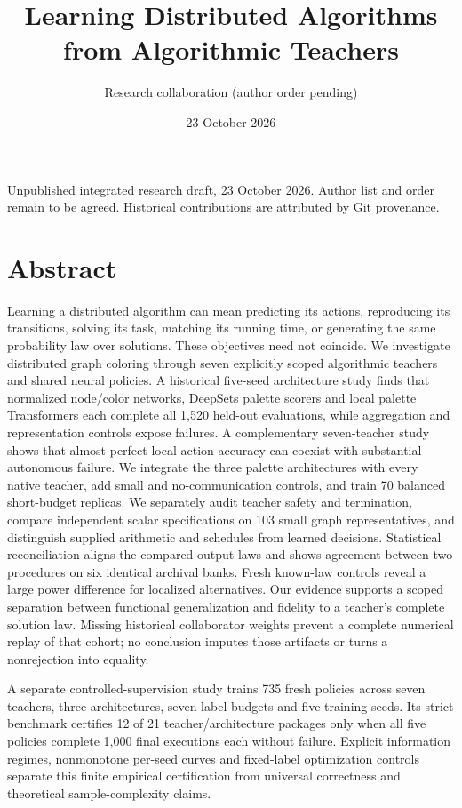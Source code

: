 \documentclass[
  11pt,
]{article}
\title{Learning Distributed Algorithms from Algorithmic Teachers}
\author{Research collaboration (author order pending)}
\date{23 October 2026}
\begin{document}
\maketitle

Unpublished integrated research draft, 23 October 2026. Author list and
order remain to be agreed. Historical contributions are attributed by
Git provenance.

\section*{Abstract}\label{abstract}

Learning a distributed algorithm can mean predicting its actions,
reproducing its transitions, solving its task, matching its running
time, or generating the same probability law over solutions. These
objectives need not coincide. We investigate distributed graph coloring
through seven explicitly scoped algorithmic teachers and shared neural
policies. A historical five-seed architecture study finds that
normalized node/color networks, DeepSets palette scorers and local
palette Transformers each complete all 1,520 held-out evaluations, while
aggregation and representation controls expose failures. A complementary
seven-teacher study shows that almost-perfect local action accuracy can
coexist with substantial autonomous failure. We integrate the three
palette architectures with every native teacher, add small and
no-communication controls, and train 70 balanced short-budget replicas.
We separately audit teacher safety and termination, compare independent
scalar specifications on 103 small graph representatives, and
distinguish supplied arithmetic and schedules from learned decisions.
Statistical reconciliation aligns the compared output laws and shows
agreement between two procedures on six identical archival banks. Fresh
known-law controls reveal a large power difference for localized
alternatives. Our evidence supports a scoped separation between
functional generalization and fidelity to a teacher's complete solution
law. Missing historical collaborator weights prevent a complete
numerical replay of that cohort; no conclusion imputes those artifacts
or turns a nonrejection into equality.

A separate controlled-supervision study trains 735 fresh policies across
seven teachers, three architectures, seven label budgets and five
training seeds. Its strict benchmark certifies 12 of 21
teacher/architecture packages only when all five policies complete 1,000
final executions each without failure. Explicit information regimes,
nonmonotone per-seed curves and fixed-label optimization controls
separate this finite empirical certification from universal correctness
and theoretical sample-complexity claims.
\end{document}
